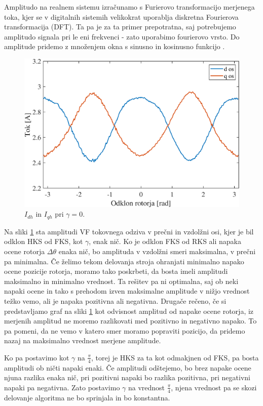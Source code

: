 \documentclass[a4paper,twoside,openright,12pt,slovene]{book}
\begin{document}
Amplitudo na realnem sistemu izračunamo s Furierovo transformacijo merjenega toka, kjer se v digitalnih sistemih velikokrat uporablja diskretna Fourierova transformacija (DFT). Ta pa je za ta primer
prepotratna, saj potrebujemo amplitudo signala pri le eni frekvenci - zato uporabimo fourierovo vrsto. Do amplitude pridemo z množenjem okna s sinusno in kosinusno funkcijo
\cite{enwiki:fourierSeries}. 

\begin{figure}[!htbp]
    \centering
    \includegraphics[width=0.9\columnwidth]{Slike/tokovniOdzivKot0.eps}
    \caption{\label{tokovniOdzivKot0} $I_{dh}$ in $I_{qh}$ pri $\gamma = 0$.}
\end{figure}

Na sliki \ref{tokovniOdzivKot0} sta amplitudi VF tokovnega odziva v prečni in vzdolžni osi, kjer je bil odklon HKS od FKS, kot $\gamma$, enak nič. Ko je odklon FKS od RKS ali napaka ocene rotorja
$\Delta\theta$ enaka nič, bo amplituda v vzdolžni smeri maksimalna, v prečni pa minimalna. Če želimo tekom delovanja stroja ohranjati minimalno napako ocene pozicije rotorja, moramo tako poskrbeti, da
bosta imeli amplitudi maksimalno in minimalno vrednost. Ta rešitev pa ni optimalna, saj ob neki napaki ocene in tako s prehodom izven maksimalne amplitude v nižjo vrednost težko vemo, ali je napaka
pozitivna ali negativna. Drugače rečeno, če si predstavljamo graf na sliki \ref{tokovniOdzivKot0} kot odvisnost amplitud od napake ocene rotorja, iz merjenih amplitud ne moremo razlikovati med
pozitivno in negativno napako. To pa pomeni, da ne vemo v katero smer moramo popraviti pozicijo, da pridemo nazaj na maksimalno vrednost merjene amplitude.



Ko pa postavimo kot $\gamma$ na $\frac{\pi}{4}$, torej je HKS za ta kot odmakjnen od FKS, pa bosta amplitudi ob ničti napaki enaki. Če amplitudi odštejemo, bo brez napake ocene njuna razlika enaka nič,
pri pozitivni napaki bo razlika pozitivna, pri negativni napaki pa negativna. Zato postavimo $\gamma$ na vrednost $\frac{\pi}{4}$, njena vrednost pa se skozi delovanje algoritma ne bo sprinjala in bo
konstantna.
\end{document}
